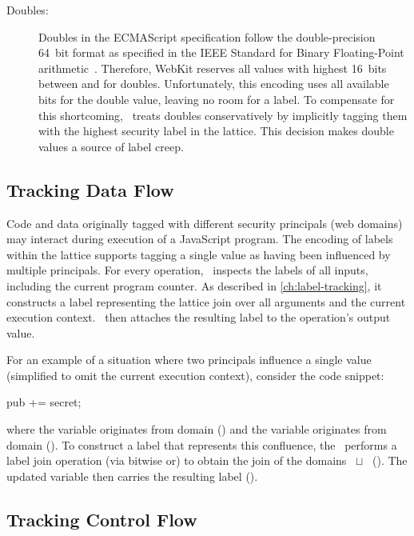 \begin{description}
\item[Doubles:]
Doubles in the ECMAScript specification follow the double-precision 64~bit format as specified in the IEEE Standard for Binary Floating-Point arithmetic~\cite{ieee754}.
Therefore, WebKit reserves all values with highest 16~bits between  and  for doubles.
Unfortunately, this encoding uses all available bits for the double value, leaving no room for a label.
To compensate for this shortcoming, \JitFlow\ treats doubles conservatively by implicitly tagging them with the highest security label in the lattice.
This decision makes double values a source of label creep.

\end{description}

\subsection{Tracking Data Flow}
\label{sec:jitflow-tracking-dataflow}

Code and data originally tagged with different security principals (web domains) may interact during execution of a JavaScript program.
The encoding of labels within the lattice supports tagging a single value as having been influenced by multiple principals.
For every operation, \JitFlow\ inspects the labels of all inputs, including the current program counter.
As described in \autoref{ch:label-tracking}, it constructs a label representing the lattice join over all arguments and the current execution context.
\JitFlow\ then attaches the resulting label to the operation's output value.

For an example of a situation where two principals influence a single value (simplified to omit the current execution context), consider the code snippet:

\begin{snippet}
pub += secret;
\end{snippet}

where the variable  originates from domain  () and the variable  originates from domain  ().
To construct a label that represents this confluence, the \JitFlow\ performs a label join operation (via bitwise or) to obtain the join of the domains ~$\sqcup$~ ().
The updated variable  then carries the resulting label ().


\subsection{Tracking Control Flow}
\label{sec:jitflow-tracking-controlflow}


